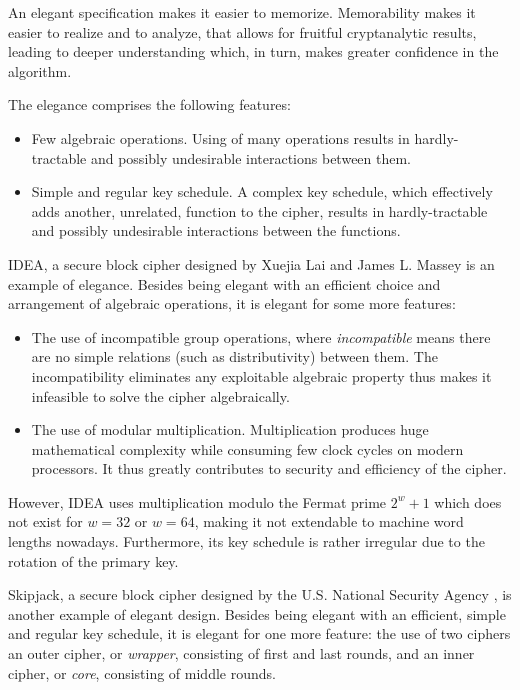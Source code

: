 \documentclass[a4paper,oneside,english]{amsart}
\numberwithin{equation}{section}
\numberwithin{figure}{section}
\begin{document}
An elegant specification makes it easier to memorize. Memorability
makes it easier to realize and to analyze, that allows for fruitful
cryptanalytic results, leading to deeper understanding which, in turn,
makes greater confidence in the algorithm.

The elegance comprises the following features: 
\begin{itemize}
\item Few algebraic operations. Using of many operations results in hardly-tractable
and possibly undesirable interactions between them.
\item Simple and regular key schedule. A complex key schedule, which effectively
adds another, unrelated, function to the cipher, results in hardly-tractable
and possibly undesirable interactions between the functions.
\end{itemize}
IDEA, a secure block cipher designed by Xuejia Lai and James L. Massey
\cite{LM91,LMM91} is an example of elegance. Besides being elegant
with an efficient choice and arrangement of algebraic operations,
it is elegant for some more features: 
\begin{itemize}
\item The use of incompatible group operations, where \emph{incompatible}
means there are no simple relations (such as distributivity) between
them. The incompatibility eliminates any exploitable algebraic property
thus makes it infeasible to solve the cipher algebraically.
\item The use of modular multiplication. Multiplication produces huge mathematical
complexity while consuming few clock cycles on modern processors.
It thus greatly contributes to security and efficiency of the cipher.
\end{itemize}
However, IDEA uses multiplication modulo the Fermat prime $2^{w}+1$
which does not exist for $w=32$ or $w=64$, making it not extendable
to machine word lengths nowadays. Furthermore, its key schedule is
rather irregular due to the rotation of the primary key.

Skipjack, a secure block cipher designed by the U.S. National Security
Agency \cite{NSA98}, is another example of elegant design. Besides
being elegant with an efficient, simple and regular key schedule,
it is elegant for one more feature: the use of two ciphers \textemdash{}
an outer cipher, or \emph{wrapper}, consisting of first and last rounds,
and an inner cipher, or \emph{core}, consisting of middle rounds.
\end{document}
